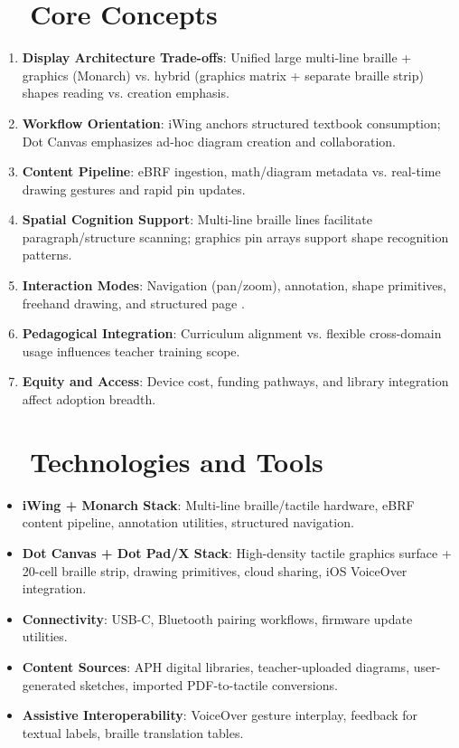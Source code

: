 \section{~~Core Concepts}
\label{sec:sr29-core-concepts}
\begin{enumerate}
	\item \textbf{Display Architecture Trade-offs}: Unified large multi-line braille + graphics (Monarch) vs. hybrid (graphics matrix + separate braille strip) shapes reading vs. creation emphasis.
	\item \textbf{Workflow Orientation}: iWing anchors structured textbook consumption; Dot Canvas emphasizes ad-hoc diagram creation and collaboration.
	\item \textbf{Content Pipeline}: eBRF ingestion, math/diagram metadata vs. real-time drawing gestures and rapid pin updates.
	\item \textbf{Spatial Cognition Support}: Multi-line braille lines facilitate paragraph/structure scanning; graphics pin arrays support shape recognition patterns.
	\item \textbf{Interaction Modes}: Navigation (pan/zoom), annotation, shape primitives, freehand drawing, and structured page .
	\item \textbf{Pedagogical Integration}: Curriculum alignment vs. flexible cross-domain usage influences teacher training scope.
	\item \textbf{Equity and Access}: Device cost, funding pathways, and library integration affect adoption breadth.
\end{enumerate}

\section{~~Technologies and Tools}
\label{sec:sr29-technologies}
\begin{itemize}
	\item \textbf{iWing + Monarch Stack}: Multi-line braille/tactile hardware, eBRF content pipeline, annotation utilities, structured navigation\supercite{paths_monarch, nelowvision_monarch}.
	\item \textbf{Dot Canvas + Dot Pad/X Stack}: High-density tactile graphics surface + 20-cell braille strip, drawing primitives, cloud sharing, iOS VoiceOver integration\supercite{dot_appstore, visionaid_dotpad}.
	\item \textbf{Connectivity}: USB-C, Bluetooth pairing workflows, firmware update utilities.
	\item \textbf{Content Sources}: APH digital libraries, teacher-uploaded diagrams, user-generated sketches, imported PDF-to-tactile conversions\supercite{ces_dotcanvas}.
	\item \textbf{Assistive Interoperability}: VoiceOver gesture interplay,  feedback for textual labels, braille translation tables.
\end{itemize}


